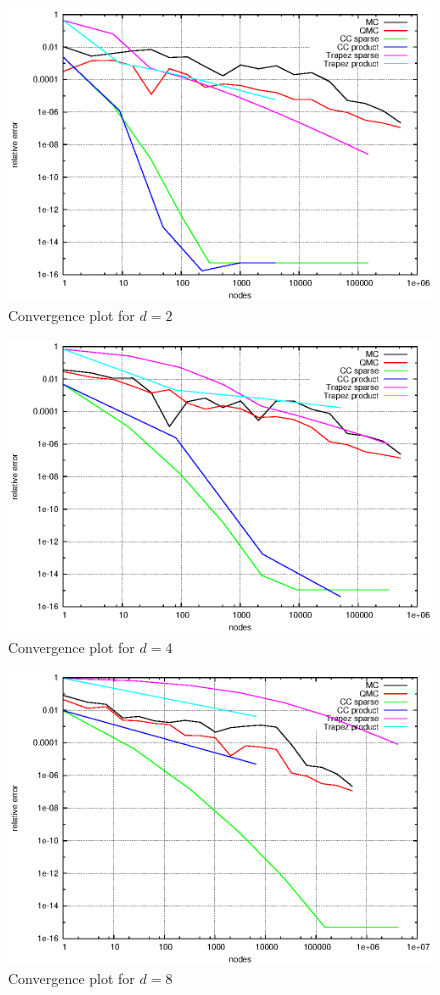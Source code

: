 \documentclass[]{article}
\begin{document}
\begin{figure}[!ht]
\centering
\includegraphics[width=.9\textwidth]{task13_d2}
\caption{Convergence plot for $d=2$}
\label{fig:Task13b}
\end{figure}

\begin{figure}[!ht]
\centering
\includegraphics[width=.9\textwidth]{task13_d4}
\caption{Convergence plot for $d=4$}
\label{fig:Task13c}
\end{figure}

\begin{figure}[!ht]
\centering
\includegraphics[width=.9\textwidth]{task13_d8}
\caption{Convergence plot for $d=8$}
\label{fig:Task13d}
\end{figure}
\clearpage
\end{document}
